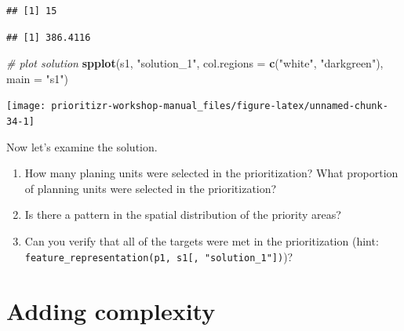 \documentclass[12pt,]{book}
\makeatletter
\newenvironment{Shaded}{\begin{snugshade}}{\end{snugshade}}
\newcommand{\CommentTok}[1]{\textcolor[rgb]{0.56,0.35,0.01}{\textit{#1}}}
\newcommand{\DataTypeTok}[1]{\textcolor[rgb]{0.13,0.29,0.53}{#1}}
\newcommand{\DecValTok}[1]{\textcolor[rgb]{0.00,0.00,0.81}{#1}}
\newcommand{\KeywordTok}[1]{\textcolor[rgb]{0.13,0.29,0.53}{\textbf{#1}}}
\newcommand{\NormalTok}[1]{#1}
\newcommand{\OperatorTok}[1]{\textcolor[rgb]{0.81,0.36,0.00}{\textbf{#1}}}
\newcommand{\StringTok}[1]{\textcolor[rgb]{0.31,0.60,0.02}{#1}}
\providecommand{\tightlist}{%
  \setlength{\itemsep}{0pt}\setlength{\parskip}{0pt}}
\newenvironment{kframe}{%
\medskip{}
\setlength{\fboxsep}{.8em}
 \def\at@end@of@kframe{}%
 \ifinner\ifhmode%
  \def\at@end@of@kframe{\end{minipage}}%
  \begin{minipage}{\columnwidth}%
 \fi\fi%
 \def\FrameCommand##1{\hskip\@totalleftmargin \hskip-\fboxsep
 \colorbox{shadecolor}{##1}\hskip-\fboxsep
     \hskip-\linewidth \hskip-\@totalleftmargin \hskip\columnwidth}%
 \MakeFramed {\advance\hsize-\width
   \@totalleftmargin\z@ \linewidth\hsize
   \@setminipage}}%
 {\par\unskip\endMakeFramed%
 \at@end@of@kframe}
\newenvironment{rmdblock}[1]
  {
  \begin{itemize}
  \renewcommand{\labelitemi}{
    \raisebox{-.7\height}[0pt][0pt]{
      {\setkeys{Gin}{width=3em,keepaspectratio}\texttt{[image: images/\#1]}}
    }
  }
  \setlength{\fboxsep}{1em}
  \begin{kframe}
  \item
  }
  {
  \end{kframe}
  \end{itemize}
  }
\newenvironment{rmdquestion}
  {\begin{rmdblock}{question}}
  {\end{rmdblock}}
\makeatother
\begin{document}
\begin{verbatim}
## [1] 15
\end{verbatim}

\begin{Shaded}
\end{Shaded}

\begin{verbatim}
## [1] 386.4116
\end{verbatim}

\begin{Shaded}
\begin{Highlighting}[]
\CommentTok{# plot solution}
\KeywordTok{spplot}\NormalTok{(s1, }\StringTok{"solution_1"}\NormalTok{, }\DataTypeTok{col.regions =} \KeywordTok{c}\NormalTok{(}\StringTok{"white"}\NormalTok{, }\StringTok{"darkgreen"}\NormalTok{), }\DataTypeTok{main =} \StringTok{"s1"}\NormalTok{)}
\end{Highlighting}
\end{Shaded}

\begin{center}\texttt{[image: prioritizr-workshop-manual\_files/figure-latex/unnamed-chunk-34-1]} \end{center}

Now let's examine the solution.

\begin{rmdquestion}
\begin{enumerate}
\def\labelenumi{\arabic{enumi}.}
\tightlist
\item
  How many planing units were selected in the prioritization? What proportion of planning units were selected in the prioritization?
\item
  Is there a pattern in the spatial distribution of the priority areas?
\item
  Can you verify that all of the targets were met in the prioritization (hint: \texttt{feature\_representation(p1,\ s1{[},\ "solution\_1"{]})})?
\end{enumerate}
\end{rmdquestion}

\hypertarget{adding-complexity}{%
\section{Adding complexity}\label{adding-complexity}}
\end{document}
